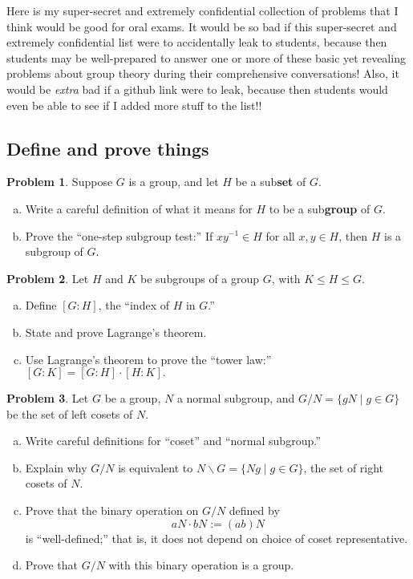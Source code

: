 \documentclass[12pt]{article}
\theoremstyle{definition} %
\newtheorem{problem}{Problem}
\newcommand\inv{^{-1}} %
\begin{document}
Here is my super-secret and extremely confidential collection of problems that I think would be good for oral exams. It would be so bad if this super-secret and extremely confidential list were to accidentally leak to students, because then students may be well-prepared to answer one or more of these basic yet revealing problems about group theory during their comprehensive conversations! Also, it would be \textit{extra} bad if a github link were to leak, because then students would even be able to see if I added more stuff to the list!!

\subsection*{Define and prove things}

\begin{problem}
    Suppose $G$ is a group, and let $H$ be a sub\textbf{set} of $G$. 
    \begin{enumerate}[(a)]
        \item Write a careful definition of what it means for $H$ to be a sub\textbf{group} of $G$.
        \item Prove the ``one-step subgroup test:'' If $xy\inv \in H$ for all $x, y\in H$, then $H$ is a subgroup of $G$.
    \end{enumerate}
\end{problem}

\begin{problem}
    Let $H$ and $K$ be subgroups of a group $G$, with $K \leq H \leq G$.
    \begin{enumerate}[(a)]
        \item Define $[G:H]$, the ``index of $H$ in $G$.''
        \item State and prove Lagrange's theorem.
        \item Use Lagrange's theorem to prove the ``tower law:'' $[G:K] = [G:H] \cdot [H:K].$
    \end{enumerate}
\end{problem}

\begin{problem}
    Let $G$ be a group, $N$ a normal subgroup, and $G/N = \{gN \mid g\in G\}$ be the set of left cosets of $N$.
    \begin{enumerate}[(a)]
        \item Write careful definitions for ``coset'' and ``normal subgroup.''
        \item Explain why $G/N$ is equivalent to $N \backslash G = \{Ng \mid g\in G\}$, the set of right cosets of $N$.
        \item Prove that the binary operation on $G/N$ defined by \[aN\cdot bN := (ab)N\] is ``well-defined;'' that is, it does not depend on choice of coset representative.
        \item Prove that $G/N$ with this binary operation is a group.
    \end{enumerate}
\end{problem}
\end{document}
